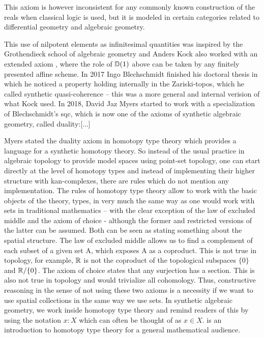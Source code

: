 \documentclass{../util/zariski}
\begin{document}
This axiom is however inconsistent for any commonly known construction of the reals when classical logic is used, but it is modeled in certain categories related to differential geometry and algebraic geometry.

This use of nilpotent elements as infinitesimal quantities was inspired by the Grothendieck school of algebraic geometry and Anders Kock also worked with an extended axiom \cite{Kock74}, where the role of $\mathbb{D}(1)$ above can be taken by any finitely presented affine scheme. In 2017 Ingo Blechschmidt finished his doctoral thesis in which he noticed a property holding internally in the Zariski-topos, which he called synthetic quasi-coherence -- this was a more general and internal verision of what Kock used. In 2018, David Jaz Myers started to work with a specialization of Blechschmidt's sqc, which is now one of the axioms of synthetic algebraic geometry, called duality:[...]

Myers stated the duality axiom in homotopy type theory which provides a language for a synthetic homotopy theory.
So instead of the usual practice in algebraic topology to provide model spaces using point-set topology, one can start directly at the level of homotopy types and instead of implementing their higher structure with kan-complexes, there are rules which do not mention any implementation.
The rules of homotopy type theory allow to work with the basic objects of the theory, types, in very much the same way as one would work with sets in traditional mathematics -- with the clear exception of the law of excluded middle and the axiom of choice - although the former and restricted versions of the latter can be assumed.
Both can be seen as stating something about the spatial structure. The law of excluded middle allows us to find a complement of each subset of a given set A, which exposes A as a coproduct.
This is not true in topology, for example, $\mathbb{R}$ is not the coproduct of the topological subspaces $\{0\}$ and $\mathbb{R}/\{0\}$.
The axiom of choice states that any surjection has a section. This is also not true in topology and would trivialize all cohomology.
Thus, constructive reasoning in the sense of not using these two axioms is a necessity if we want to use spatial collections in the same way we use sets.
In synthetic algebraic geometry, we work inside homotopy type theory and remind readers of this by using the notation $x:X$ which can often be thought of as $x\in X$.
\cite{shulman-logic-of-spaces} is an introduction to homotopy type theory for a general mathematical audience.
\end{document}
